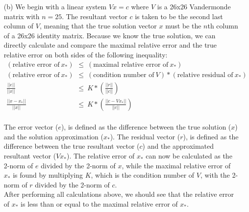 \documentclass{article}
\begin{document}
\begin{enumerate}

    \item[(b)]  We begin with a linear system $Vx=c$ where $V$ is a 26x26 Vandermonde matrix with $n=25$. The resultant vector $c$
                is taken to be the second last column of $V$, meaning that the true solution vector $x$ must be the $n$th column of
                a 26x26 identity matrix. Because we know the true solution, we can directly calculate and compare the maximal relative
                error and the true relative error on both sides of the following inequality:
                \begin{align*}
                    (\text{relative error of}~x_{*})~ &\leq ~(\text{maximal relative error of}~x_{*})\\
                    (\text{relative error of}~x_{*})~ &\leq ~(\text{condition number of}~V)*(\text{relative residual of}~x_{*})\\
                                 \frac{||e||}{||x||}~ &\leq ~K* \left(\frac{||r||}{||c||} \right) \\
                           \frac{||x-x_{*}||}{||x||}~ &\leq ~K* \left(\frac{||c-Vx_{*}||}{||c||} \right)
                \end{align*}
                \\The error vector ($e$), is defined as the difference between the true solution ($x$)
                and the solution approximation ($x_{*}$). The residual vector ($r$), is defined as the difference between
                the true resultant vector ($c$) and the approximated resultant vector ($Vx_{*}$). The relative error
                of $x_{*}$ can now be calculated as the 2-norm of $e$ divided by the 2-norm of $x$, while the maximal
                relative error of $x_{*}$ is found by multiplying $K$, which is the condition number of $V$, with the 2-norm of $r$
                divided by the 2-norm of $c$.\\
                After performing all calculations above, we should see that the relative error of $x_{*}$ is less than or equal to
                the maximal relative error of $x_{*}$.
                \pagebreak\\\\\\\\


\end{enumerate}
\end{document}
